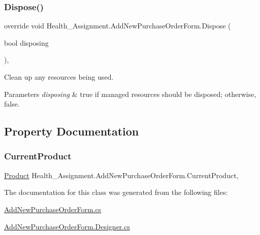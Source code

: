 \subsubsection{\texorpdfstring{Dispose()}{Dispose()}}
{\footnotesize\ttfamily override void Health\+\_\+\+Assignment.\+Add\+New\+Purchase\+Order\+Form.\+Dispose (\begin{DoxyParamCaption}\item[{bool}]{disposing }\end{DoxyParamCaption})\hspace{0.3cm}{\ttfamily [inline]}, {\ttfamily [protected]}}



Clean up any resources being used. 


\begin{DoxyParams}{Parameters}
{\em disposing} & true if managed resources should be disposed; otherwise, false.\\
\hline
\end{DoxyParams}


\subsection{Property Documentation}
\mbox{\label{class_health___assignment_1_1_add_new_purchase_order_form_a90c7443f01cf3ee8be0c88f224a19b20}} 
\subsubsection{\texorpdfstring{Current\+Product}{CurrentProduct}}
{\footnotesize\ttfamily \hyperlink{class_health___assignment_1_1_product}{Product} Health\+\_\+\+Assignment.\+Add\+New\+Purchase\+Order\+Form.\+Current\+Product\hspace{0.3cm}{\ttfamily [get]}, {\ttfamily [set]}}



The documentation for this class was generated from the following files\+:\begin{DoxyCompactItemize}
\item 
\hyperlink{_add_new_purchase_order_form_8cs}{Add\+New\+Purchase\+Order\+Form.\+cs}\item 
\hyperlink{_add_new_purchase_order_form_8_designer_8cs}{Add\+New\+Purchase\+Order\+Form.\+Designer.\+cs}\end{DoxyCompactItemize}
